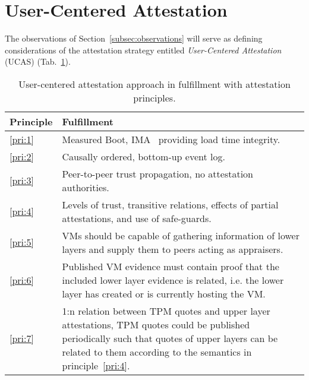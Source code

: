 \section{User-Centered Attestation}

The observations of Section~\ref{subsec:observations} will serve as defining considerations of the attestation strategy entitled \emph{User-Centered Attestation} (UCAS) (Tab.~\ref{tab:3}). 

\begin{table}[!h]
  \caption{User-centered attestation approach in fulfillment with attestation principles.}
\label{tab:3}
  \begin{center}
    \begin{tabular}{p{1cm}|p{}} %
 \toprule
 Principle & Fulfillment \\
 \midrule
 \ref{pri:1} & Measured Boot, IMA~\cite{IMA} providing load time integrity.\\ %
 \midrule
 \ref{pri:2} & Causally ordered, bottom-up event log. \\ 
 \midrule
 \ref{pri:3} & Peer-to-peer trust propagation, no attestation authorities. \\
 \midrule
 \ref{pri:4} & Levels of trust, transitive relations, effects of partial attestations, and use of safe-guards. \\
 \midrule
 \ref{pri:5} & VMs should be capable of gathering information of lower layers and supply them to peers acting as appraisers.\\
 \midrule
 \ref{pri:6} & Published VM evidence must contain proof that the included lower layer evidence is related, i.e. the lower layer has created or is currently hosting the VM.\\
 \midrule
 \ref{pri:7} & 1:n relation between TPM quotes and upper layer attestations, TPM quotes could be published periodically such that quotes of upper layers can be related to them according to the semantics in principle~\ref{pri:4}. \\
 \bottomrule
  \end{tabular}
  \end{center}
\end{table}

